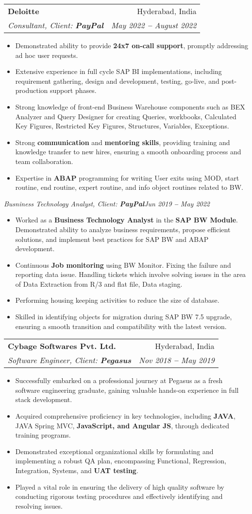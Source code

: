 \documentclass[letterpaper,11pt]{article}
\makeatletter
\newcommand{\resumeItem}[1]{
  \item\small{
    {#1 \vspace{-2pt}}
  }
}
\newcommand{\resumeSubheading}[4]{
  \vspace{-2pt}\item
    \begin{tabular*}{0.97\textwidth}[t]{l@{\extracolsep{\fill}}r}
      \textbf{#1} & #2 \\
      \textit{\small#3} & \textit{\small #4} \\
    \end{tabular*}\vspace{-7pt}
}
\newcommand{\resumeItemListStart}{\begin{itemize}}
\newcommand{\resumeItemListEnd}{\end{itemize}\vspace{-5pt}}
\makeatother
\begin{document}
    \resumeSubheading
      {Deloitte}{Hyderabad, India}
      {Consultant, Client: \textbf{PayPal}}{May 2022 \textbf{--} August 2022}
       \resumeItemListStart
            \resumeItem{Demonstrated ability to provide \textbf{24x7 on-call support}, promptly addressing ad hoc user requests.}
            \resumeItem{Extensive experience in full cycle SAP BI implementations, including requirement gathering, design and development, testing, go-live, and post-production support phases.}
            \resumeItem{Strong knowledge of front-end Business Warehouse components such as BEX Analyzer and Query Designer for creating Queries, workbooks, Calculated Key Figures, Restricted Key Figures, Structures, Variables, Exceptions.}
            \resumeItem{Strong \textbf{communication} and \textbf{mentoring skills}, providing training and knowledge transfer to new hires, ensuring a smooth onboarding process and team collaboration.}
            \resumeItem{Expertise in \textbf{ABAP} programming for writing User exits using MOD, start routine, end routine, expert routine, and info object routines related to BW.}
       \resumeItemListEnd
     \vspace{3pt}  
      \textit{\small{Busniness Technology Analyst, Client: \textbf{PayPal}\hfill{Jun 2019 \textbf{--} May 2022}}}
        \resumeItemListStart
            \resumeItem{Worked as a \textbf{Business Technology Analyst} in the \textbf{SAP BW Module}. Demonstrated ability to analyze business requirements, propose efficient solutions, and implement best practices for SAP BW and ABAP development.}
            \resumeItem{Continuous \textbf{Job monitoring} using BW Monitor. Fixing the failure and reporting data issue. Handling tickets which involve solving issues in the area of Data Extraction from R/3 and flat file, Data staging.}
            \resumeItem{Performing housing keeping activities to reduce the size of database.}
            \resumeItem{Skilled in identifying objects for migration during SAP BW 7.5 upgrade, ensuring a smooth transition and compatibility with the latest version.}
        \resumeItemListEnd
        \vspace{2pt}
    \resumeSubheading
      {Cybage Softwares Pvt. Ltd.}{Hyderabad, India}
      {Software Engineer, Client: \textbf{Pegasus}}{Nov 2018 \textbf{--} May 2019}
        \resumeItemListStart
            \resumeItem{Successfully embarked on a professional journey at Pegasus as a fresh software engineering graduate, gaining valuable hands-on experience in full stack development.}
            \resumeItem{Acquired comprehensive proficiency in key technologies, including \textbf{JAVA}, JAVA Spring MVC, \textbf{JavaScript, and Angular JS}, through dedicated training programs.}
            \resumeItem{Demonstrated exceptional organizational skills by formulating and implementing a robust QA plan, encompassing Functional, Regression, Integration, Systems, and \textbf{UAT testing}.}
            \resumeItem{Played a vital role in ensuring the delivery of high quality software by conducting rigorous testing procedures and effectively identifying and resolving issues.}
        \resumeItemListEnd
    
\end{document}
